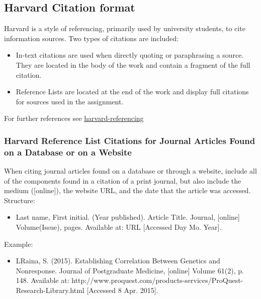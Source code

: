 

\subsection{Harvard Citation format}


Harvard is a style of referencing, primarily used by university students, to cite information sources.
Two types of citations are included:\\

\begin{itemize}
	\item In-text citations are used when directly quoting or paraphrasing a source. They are located in the body of the work and contain a fragment of the full citation. 
	\item Reference Lists are located at the end of the work and display full citations for sources used in the assignment.
\end{itemize}
For further references see \href{http://www.citethisforme.com/harvard-referencing}{harvard-referencing}

\subsubsection{Harvard Reference List Citations for Journal Articles Found on a Database or on a Website}

When citing journal articles found on a database or through a website, include all of the components found in a citation of a print journal, but also include the medium ([online]), the website URL, and the date that the article was accessed.\\
Structure:\\
\begin{itemize}
	\item Last name, First initial. (Year published). Article Title. Journal, [online] Volume(Issue), pages. Available at: URL [Accessed Day Mo. Year].
\end{itemize}
Example:\\
\begin{itemize}
	\item LRaina, S. (2015). Establishing Correlation Between Genetics and Nonresponse. Journal of Postgraduate Medicine, [online] Volume 61(2), p. 148. Available at: http://www.proquest.com/products-services/ProQuest-Research-Library.html [Accessed 8 Apr. 2015].
\end{itemize}

